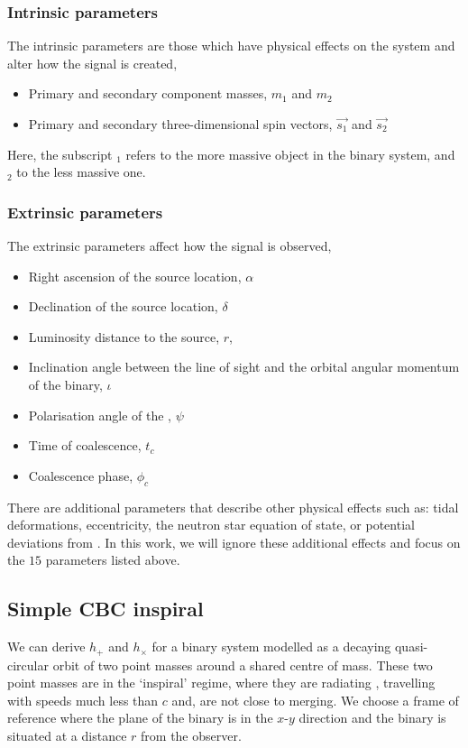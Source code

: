 \subsubsection{Intrinsic parameters}
The intrinsic parameters are those which have physical effects on the system and alter how the \gwadj signal is created,
\begin{itemize}
   \item Primary and secondary component masses, $m_{1}$ and $m_{2}$
   \item Primary and secondary three-dimensional spin vectors, $\vec{s_{1}}$ and $\vec{s_{2}}$
\end{itemize}
Here, the subscript $_1$ refers to the more massive object in the binary system, and $_2$ to the less massive one.

\subsubsection{Extrinsic parameters}
The extrinsic parameters affect how the \gwadj signal is observed,
\begin{itemize}
   \item Right ascension of the source location, $\alpha$ 
   \item Declination of the source location, $\delta$
   \item Luminosity distance to the source, $r$, 
   \item Inclination angle between the line of sight and the orbital angular momentum of the binary, $\iota$
   \item Polarisation angle of the \gw, $\psi$
   \item Time of coalescence, $t_{c}$
   \item Coalescence phase, $\phi_{c}$ 
\end{itemize}

There are additional parameters that describe other physical effects such as: tidal deformations, eccentricity, the neutron star equation of state, or potential deviations from \GR. In this work, we will ignore these additional effects and focus on the $15$ parameters listed above.

\subsection{\label{1:sec:keplerian_derivation}Simple CBC inspiral}

We can derive $h_{+}$ and $h_{\times}$ for a binary system modelled as a decaying quasi-circular orbit of two point masses around a shared centre of mass. These two point masses are in the `inspiral' regime, where they are radiating \gws, travelling with speeds much less than $c$ and, are not close to merging. We choose a frame of reference where the plane of the binary is in the $x$-$y$ direction and the binary is situated at a distance $r$ from the observer.

